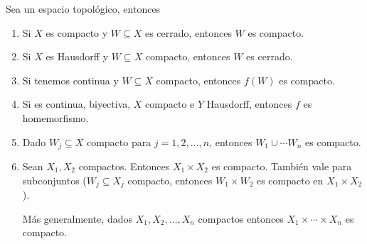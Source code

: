 \documentclass{apuntes}
\begin{document}
\begin{prop} Sea \tops un espacio topológico, entonces
\begin{enumerate}
	\item Si $X$ es compacto y $W⊆X$ es cerrado, entonces $W$ es compacto.
	\item Si $X$ es Hausdorff y $W⊆X$ compacto, entonces $W$ es cerrado.
	\item Si tenemos \stdf continua y $W⊆X$ compacto, entonces $f(W)$ es compacto.
	\item Si \stdf es continua, biyectiva, $X$ compacto e $Y$ Hausdorff, entonces $f$ es homemorfismo.
	\item Dado $W_j⊆X$ compacto para $j=1,2,\dotsc, n$, entonces $W_1 ∪ \dotsb W_n$ es compacto.
	\item Sean $X_1, X_2$ compactos. Entonces $X_1×X_2$ es compacto. También vale para subconjuntos ($W_j ⊆ X_j$ compacto, entonces $W_1 × W_2$ es compacto en $X_1×X_2$).

	Más generalmente, dados $X_1,X_2,\dotsc, X_n$ compactos entonces $X_1 × \dotsb × X_n$ es compacto.
\end{enumerate}
\end{prop}
\end{document}
